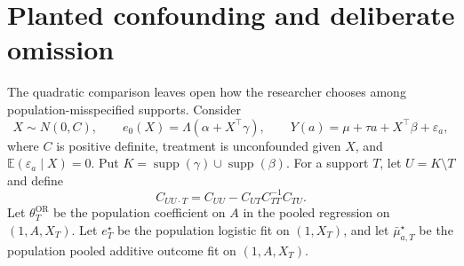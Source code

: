 \documentclass[a4paper,10pt,english]{article}
\newcommand{\E}{\mathbb E}
\begin{document}
\section{Planted confounding and deliberate omission}

The quadratic comparison leaves open how the researcher chooses among
population-misspecified supports.  Consider
\begin{equation}\label{eq:planted-confounding-model}
 X\sim N(0,C),
 \qquad
 e_0(X)=\Lambda(\alpha+X^\top\gamma),
 \qquad
 Y(a)=\mu+\tau a+X^\top\beta+\varepsilon_a,
\end{equation}
where $C$ is positive definite, treatment is unconfounded given $X$, and
$\E(\varepsilon_a\mid X)=0$.  Put
$K=\operatorname{supp}(\gamma)\cup\operatorname{supp}(\beta)$.  For a
support $T$, let $U=K\setminus T$ and define
\begin{equation*}
 C_{UU\cdot T}=C_{UU}-C_{UT}C_{TT}^{-1}C_{TU}.
\end{equation*}
Let $\theta_T^{\mathrm{OR}}$ be the population coefficient on $A$ in the
pooled regression on $(1,A,X_T)$.  Let $e_T^\star$ be the population
logistic fit on $(1,X_T)$, and let
$\bar\mu_{a,T}^\star$ be the population pooled additive outcome fit on
$(1,A,X_T)$.
\end{document}

